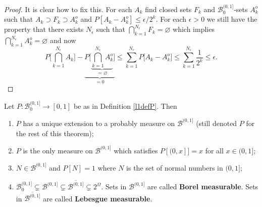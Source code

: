 \begin{proof}
It is clear how to fix this. For each $A_k$ find  closed sets $F_k$ and $\mathcal B_0^{(0,1]}$-sets $A_k^o$ such that $A_k\supset F_k \supset A_k^o$ and $P[A_k-A_k^o]\leq \epsilon / 2^k$. For each $\epsilon>0$ we still have the property that there exists $N_\epsilon$ such that  $\bigcap_{k=1}^{N_\epsilon}F_k = \varnothing$ which  implies $\bigcap_{k=1}^{N_\epsilon}A^o_k = \varnothing$  and now
\[
P\bigl[ \textstyle\bigcap_{k=1}^{N_\epsilon} A_k\bigr] - \underbrace{P\bigl[ \underbrace{\textstyle\bigcap_{k=1}^{N_\epsilon} A^o_k}_{=\varnothing}\bigr]}_{=0}\leq  \sum_{k=1}^{N_\epsilon} P\bigl[A_k-A^o_k \bigr] \leq \sum_{k=1}^{N_\epsilon} \frac{1}{2^k}\leq \epsilon.
\]
\end{proof}



\begin{theorem}
Let $P:\mathcal B_0^{(0,1]}\rightarrow [0,1]$ be as in Definition \ref{l1defP}. Then
\begin{enumerate}
\item\label{BB item 1} $P$ has a unique extension to a probably measure  on $\mathcal B^{(0,1]}$ (still denoted $P$ for the rest of this theorem);
\item\label{BB item 2} $P$ is the only measure on  $\mathcal B^{(0,1]}$ which satisfies $P[(0,x]]=x$ for all $x\in (0,1]$;
\item\label{BB item 3} $N\in \mathcal B^{(0,1]}$ and $P[N]=1$ where $N$ is the set of normal numbers in $(0,1]$;
\item\label{BB item 4} $\mathcal B_0^{(0,1]} \subsetneq \mathcal B^{(0,1]} \subsetneq  \overline{\mathcal B^{(0,1]}}\subsetneq 2^\Omega$. Sets in $\mathcal B^{(0,1]}$ are called {\bf Borel measurable}. Sets in $\overline{\mathcal B^{(0,1]}}$ are called {\bf Lebesgue measurable}.
\end{enumerate}
\end{theorem}


